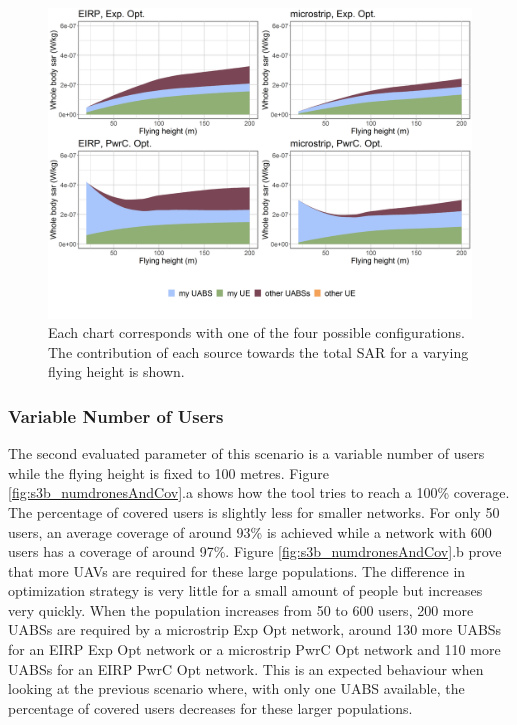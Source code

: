 \documentclass[twocolumn]{phdsymp} %
\begin{document}
\begin{figure}[h!]
  \includegraphics[width=\linewidth]{../results/s3/fhFourSources.png}
  \caption{Each chart corresponds with one of the four possible configurations. The contribution of each source towards the total 
  \acs{SAR} for a varying flying height is shown.}
  \label{fig:s3a_fourSourcesMatrix}
\end{figure}

\FloatBarrier
\subsubsection{Variable Number of Users}

The second evaluated parameter of this scenario is a variable number of users while the flying height is fixed to 100 metres.  
Figure \ref{fig:s3b_numdronesAndCov}.a shows how the tool tries to reach a 100\% coverage. The percentage
of covered users is slightly less for smaller networks. For only 50 users, an average 
coverage of around 93\% is achieved while a network with 600 users has a coverage of around 97\%.
Figure \ref{fig:s3b_numdronesAndCov}.b prove that more \gls{UAV}s are required for these large 
populations. 
The difference in optimization strategy is very little for a small amount of people but increases very quickly. 
When the population increases from 50 to 600 users,
 200 more \gls{UABS}s are required by a microstrip \gls{Exp Opt} network,
 around 130 more \gls{UABS}s for an \gls{EIRP} \gls{Exp Opt} network or a microstrip \gls{PwrC Opt} network
 and 110 more \gls{UABS}s for an \gls{EIRP} \gls{PwrC Opt} network.
This is an expected behaviour  when looking at the previous scenario where, with only one \gls{UABS} available, 
the percentage of covered users decreases for these larger populations.
\end{document}
